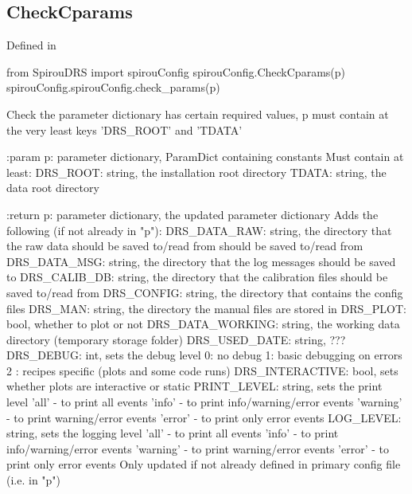 \begin{minipage}{\textwidth}
\subsection{CheckCparams}

Defined in \spirouConfig{}

\begin{pythonbox}
from SpirouDRS import spirouConfig
spirouConfig.CheckCparams(p)
spirouConfig.spirouConfig.check_params(p)
\end{pythonbox}

\begin{pythondocstring}
Check the parameter dictionary has certain required values, p must contain
at the very least keys 'DRS_ROOT' and 'TDATA'

:param p: parameter dictionary, ParamDict containing constants
    Must contain at least:
        DRS_ROOT: string, the installation root directory
        TDATA: string, the data root directory

:return p: parameter dictionary, the updated parameter dictionary
        Adds the following (if not already in "p"):
            DRS_DATA_RAW: string, the directory that the raw data should
                          be saved to/read from
                            should be saved to/read from
            DRS_DATA_MSG: string, the directory that the log messages
                          should be saved to
            DRS_CALIB_DB: string, the directory that the calibration
                          files should be saved to/read from
            DRS_CONFIG: string, the directory that contains the config files
            DRS_MAN: string, the directory the manual files are stored in
            DRS_PLOT: bool, whether to plot or not
            DRS_DATA_WORKING: string, the working data directory (temporary
                              storage folder)
            DRS_USED_DATE: string, ???
            DRS_DEBUG: int, sets the debug level
                            0: no debug
                            1: basic debugging on errors
                            2 : recipes specific (plots and some code runs)
            DRS_INTERACTIVE: bool, sets whether plots are interactive or
                             static
            PRINT_LEVEL: string, sets the print level
                               'all' - to print all events
                               'info' - to print info/warning/error events
                               'warning' - to print warning/error events
                               'error' - to print only error events
            LOG_LEVEL: string, sets the logging level
                               'all' - to print all events
                               'info' - to print info/warning/error events
                               'warning' - to print warning/error events
                               'error' - to print only error events
    Only updated if not already defined in primary config file
    (i.e. in "p")
\end{pythondocstring}
\end{minipage}

